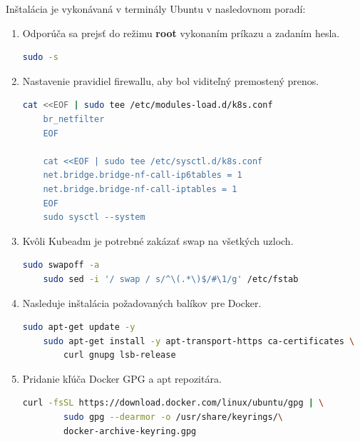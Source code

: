 Inštalácia je vykonávaná v terminály Ubuntu v nasledovnom poradí:
\begin{enumerate}
    \item{\noindent Odporúča sa prejsť do režimu \textbf{root} vykonaním príkazu a zadaním hesla.
\begin{lstlisting}[language=Bash,basicstyle=\footnotesize]
    sudo -s
    \end{lstlisting}}
\item{\noindent Nastavenie pravidiel firewallu, aby bol viditeľný premostený prenos.
\begin{lstlisting}[language=Bash,basicstyle=\footnotesize]
    cat <<EOF | sudo tee /etc/modules-load.d/k8s.conf
    br_netfilter
    EOF

    cat <<EOF | sudo tee /etc/sysctl.d/k8s.conf
    net.bridge.bridge-nf-call-ip6tables = 1
    net.bridge.bridge-nf-call-iptables = 1
    EOF
    sudo sysctl --system
    \end{lstlisting}}
    \item{\noindent Kvôli Kubeadm je potrebné zakázať swap na všetkých uzloch.
\begin{lstlisting}[language=Bash,basicstyle=\footnotesize]
    sudo swapoff -a
    sudo sed -i '/ swap / s/^\(.*\)$/#\1/g' /etc/fstab
    \end{lstlisting}}
    \item{\noindent Nasleduje inštalácia požadovaných balíkov pre Docker.
\begin{lstlisting}[language=Bash,basicstyle=\footnotesize]
    sudo apt-get update -y
    sudo apt-get install -y apt-transport-https ca-certificates \
        curl gnupg lsb-release
    \end{lstlisting}}
    \item{\noindent Pridanie kľúča Docker GPG a \acrshort{apt} repozitára.
\begin{lstlisting}[language=Bash,basicstyle=\footnotesize]
    curl -fsSL https://download.docker.com/linux/ubuntu/gpg | \
        sudo gpg --dearmor -o /usr/share/keyrings/\
        docker-archive-keyring.gpg


\end{lstlisting}}
\end{enumerate}
